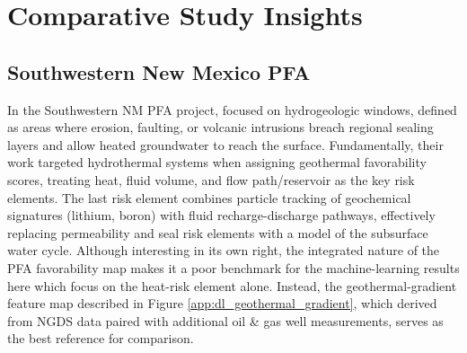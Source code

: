 \section{Comparative Study Insights}\label{ch5:case_insights}

\subsection{Southwestern New Mexico PFA}\label{ch5:caase_nm_pfa}

In the Southwestern NM PFA project, \citet{bielicki_hydrogeolgic_2015} focused on hydrogeologic windows, defined as areas where erosion, faulting, or volcanic intrusions breach regional sealing layers and allow heated groundwater to reach the surface. Fundamentally, their work targeted hydrothermal systems when assigning geothermal favorability scores, treating heat, fluid volume, and flow path/reservoir as the key risk elements. The last risk element combines particle tracking of geochemical signatures (lithium, boron) with fluid recharge-discharge pathways, effectively replacing permeability and seal risk elements with a model of the subsurface water cycle. Although interesting in its own right, the integrated nature of the PFA favorability map makes it a poor benchmark for the machine-learning results here which focus on the heat-risk element alone. Instead, the geothermal-gradient feature map described in Figure \ref{app:dl_geothermal_gradient}, which \citet{bielicki_hydrogeolgic_2015} derived from NGDS data paired with additional oil \& gas well measurements, serves as the best reference for comparison. 

